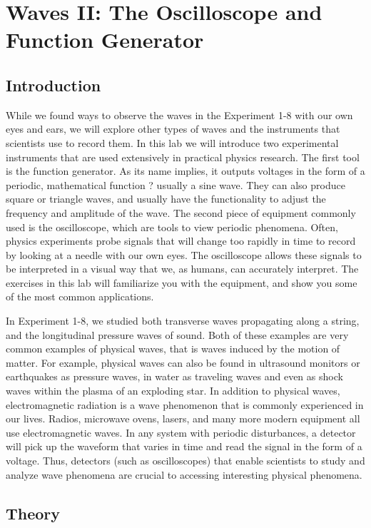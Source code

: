 \chapter{Waves II: The Oscilloscope and Function Generator}
\label{chap:waves}
\section{Introduction}
While we found ways to observe the waves in the Experiment 1-8 with our own eyes and ears, we will explore other types of waves and the instruments that scientists use to record them. In this lab we will introduce two experimental instruments that are used extensively in practical physics research. The first tool is the function generator. As its name implies, it outputs voltages in the form of a periodic, mathematical function ? usually a sine wave. They can also produce square or triangle waves, and usually have the functionality to adjust the frequency and amplitude of the wave. The second piece of equipment commonly used is the oscilloscope, which are tools to view periodic phenomena. Often, physics experiments probe signals that will change too rapidly in time to record by looking at a needle with our own eyes. The oscilloscope allows these signals to be interpreted in a visual way that we, as humans, can accurately interpret. The exercises in this lab will familiarize you with the equipment, and show you some of the most common applications.\myskip

In Experiment 1-8, we studied both transverse waves propagating along a string, and the longitudinal pressure waves of sound. Both of these examples are very common examples of physical waves, that is waves induced by the motion of matter. For example, physical waves can also be found in ultrasound monitors or earthquakes as pressure waves, in water as traveling waves and even as shock waves within the plasma of an exploding star. In addition to physical waves, electromagnetic radiation is a wave phenomenon that is commonly experienced in our lives. Radios, microwave ovens, lasers, and many more modern equipment all use electromagnetic waves. In any system with periodic disturbances, a detector will pick up the waveform that varies in time and read the signal in the form of a voltage. Thus, detectors (such as oscilloscopes) that enable scientists to study and analyze wave phenomena are crucial to accessing interesting physical phenomena.

\section{Theory}

